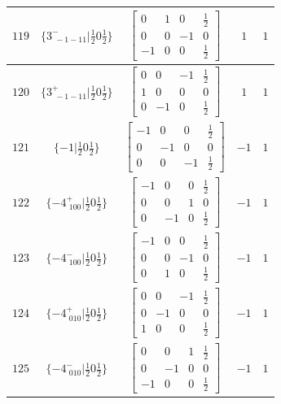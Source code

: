 \documentclass[fleqn,8pt]{jsarticle}
\begin{document}
\begin{longtable}{ccccc}
$ 119 $ & $ \{3^{-}_{\,\,-1-11}|\frac{1}{2} 0 \frac{1}{2}\} $ & $ \begin{bmatrix} 0 & 1 & 0 & \frac{1}{2} \\ 0 & 0 & -1 & 0 \\ -1 & 0 & 0 & \frac{1}{2} \end{bmatrix} $ & $ 1 $ & $ 1 $ \\ \hline
$ 120 $ & $ \{3^{+}_{\,\,-1-11}|\frac{1}{2} 0 \frac{1}{2}\} $ & $ \begin{bmatrix} 0 & 0 & -1 & \frac{1}{2} \\ 1 & 0 & 0 & 0 \\ 0 & -1 & 0 & \frac{1}{2} \end{bmatrix} $ & $ 1 $ & $ 1 $ \\ \hline
$ 121 $ & $ \{-1|\frac{1}{2} 0 \frac{1}{2}\} $ & $ \begin{bmatrix} -1 & 0 & 0 & \frac{1}{2} \\ 0 & -1 & 0 & 0 \\ 0 & 0 & -1 & \frac{1}{2} \end{bmatrix} $ & $ -1 $ & $ 1 $ \\ \hline
$ 122 $ & $ \{-4^{+}_{\,\,100}|\frac{1}{2} 0 \frac{1}{2}\} $ & $ \begin{bmatrix} -1 & 0 & 0 & \frac{1}{2} \\ 0 & 0 & 1 & 0 \\ 0 & -1 & 0 & \frac{1}{2} \end{bmatrix} $ & $ -1 $ & $ 1 $ \\ \hline
$ 123 $ & $ \{-4^{-}_{\,\,100}|\frac{1}{2} 0 \frac{1}{2}\} $ & $ \begin{bmatrix} -1 & 0 & 0 & \frac{1}{2} \\ 0 & 0 & -1 & 0 \\ 0 & 1 & 0 & \frac{1}{2} \end{bmatrix} $ & $ -1 $ & $ 1 $ \\ \hline
$ 124 $ & $ \{-4^{+}_{\,\,010}|\frac{1}{2} 0 \frac{1}{2}\} $ & $ \begin{bmatrix} 0 & 0 & -1 & \frac{1}{2} \\ 0 & -1 & 0 & 0 \\ 1 & 0 & 0 & \frac{1}{2} \end{bmatrix} $ & $ -1 $ & $ 1 $ \\ \hline
$ 125 $ & $ \{-4^{-}_{\,\,010}|\frac{1}{2} 0 \frac{1}{2}\} $ & $ \begin{bmatrix} 0 & 0 & 1 & \frac{1}{2} \\ 0 & -1 & 0 & 0 \\ -1 & 0 & 0 & \frac{1}{2} \end{bmatrix} $ & $ -1 $ & $ 1 $ \\ \hline

\end{longtable}
\end{document}
